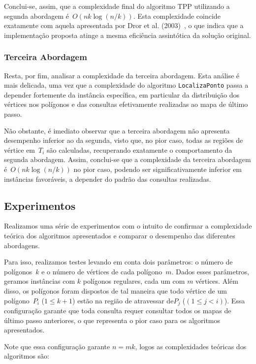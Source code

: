 \documentclass[11pt]{article}
\begin{document}
Conclui-se, assim, que a complexidade final do algoritmo TPP utilizando a segunda abordagem é~\(O(nk \log (n/k))\). Esta complexidade coincide exatamente com aquela apresentada por Dror et al. (2003)~\cite{tpp-dror2003}, o que indica que a implementação proposta atinge a mesma eficiência assintótica da solução original.

\subsubsection{Terceira Abordagem}

Resta, por fim, analisar a complexidade da terceira abordagem. Esta análise é mais delicada, uma vez que a complexidade do algoritmo \texttt{LocalizaPonto} passa a depender fortemente da instância específica, em particular da distribuição dos vértices nos polígonos e das consultas efetivamente realizadas ao mapa de último passo. 

Não obstante, é imediato observar que a terceira abordagem não apresenta desempenho inferior ao da segunda, visto que, no pior caso, todas as regiões de vértice em~\(T_i\) são calculadas, recuperando exatamente o comportamento da segunda abordagem. Assim, conclui-se que a complexidade da terceira abordagem é~\(O(nk \log (n/k))\) no pior caso, podendo ser significativamente inferior em instâncias favoráveis, a depender do padrão das consultas realizadas.

\subsection{Experimentos}

Realizamos uma série de experimentos com o intuito de confirmar a complexidade teórica dos algoritmos apresentados e comparar o desempenho das diferentes abordagens. 

Para isso, realizamos testes levando em conta dois parâmetros: o número de polígonos~\(k\) e o número de vértices de cada polígono~\(m\). Dados esses parâmetros, geramos instâncias com \(k\) polígonos regulares, cada um com \(m\) vértices. Além disso, os polígonos foram dispostos de tal maneira que todo vértice de um polígono~\(P_i\) (\(1 \le k + 1\)) estão na região de atravessar de\(P_{j}\) (\((1 \le j < i)\)). Essa configuração garante que toda consulta requer consultar todos os mapas de último passo anteriores, o que representa o pior caso para os algoritmos apresentados.

Note que essa configuração garante \(n = mk\), logos as complexidades teóricas dos algoritmos são:
\end{document}
